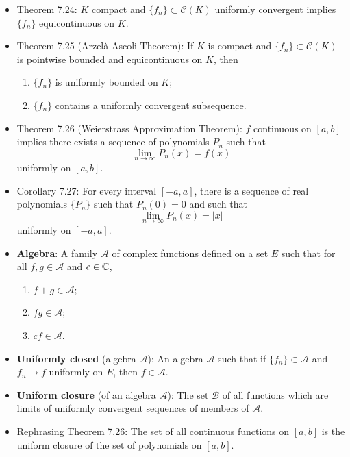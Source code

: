 \documentclass[../../notes.tex]{subfiles}
\begin{document}
\begin{itemize}
    \begin{proof}
        Diagonalization argument from class.
    \end{proof}
    \item Theorem 7.24: $K$ compact and $\{f_n\}\subset\mathscr{C}(K)$ uniformly convergent implies $\{f_n\}$ equicontinuous on $K$.
    \item Theorem 7.25 (Arzel\`{a}-Ascoli Theorem): If $K$ is compact and $\{f_n\}\subset\mathscr{C}(K)$ is pointwise bounded and equicontinuous on $K$, then
    \begin{enumerate}
        \item $\{f_n\}$ is uniformly bounded on $K$;
        \item $\{f_n\}$ contains a uniformly convergent subsequence.
    \end{enumerate}
    \item Theorem 7.26 (Weierstrass Approximation Theorem): $f$ continuous on $[a,b]$ implies there exists a sequence of polynomials $P_n$ such that
    \begin{equation*}
        \lim_{n\to\infty}P_n(x) = f(x)
    \end{equation*}
    uniformly on $[a,b]$.
    \item Corollary 7.27: For every interval $[-a,a]$, there is a sequence of real polynomials $\{P_n\}$ such that $P_n(0)=0$ and such that
    \begin{equation*}
        \lim_{n\to\infty}P_n(x) = |x|
    \end{equation*}
    uniformly on $[-a,a]$.
    \item \textbf{Algebra}: A family $\mathscr{A}$ of complex functions defined on a set $E$ such that for all $f,g\in\mathscr{A}$ and $c\in\mathbb{C}$,
    \begin{enumerate}[label={(\roman*)}]
        \item $f+g\in\mathscr{A}$;
        \item $fg\in\mathscr{A}$;
        \item $cf\in\mathscr{A}$.
    \end{enumerate}
    \item \textbf{Uniformly closed} (algebra $\mathscr{A}$): An algebra $\mathscr{A}$ such that if $\{f_n\}\subset\mathscr{A}$ and $f_n\to f$ uniformly on $E$, then $f\in\mathscr{A}$.
    \item \textbf{Uniform closure} (of an algebra $\mathscr{A}$): The set $\mathscr{B}$ of all functions which are limits of uniformly convergent sequences of members of $\mathscr{A}$.
    \item Rephrasing Theorem 7.26: The set of all continuous functions on $[a,b]$ is the uniform closure of the set of polynomials on $[a,b]$.

\end{itemize}
\end{document}

